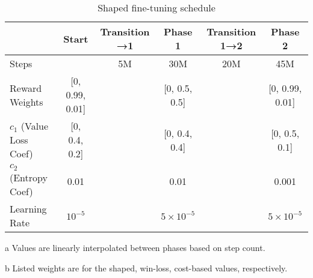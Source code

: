 \documentclass[conference]{IEEEtran}
\newcounter{supptable}
\newenvironment{supptable}
  {\renewcommand{\tablename}{Supplemental Table}\setcounter{table}{\value{supptable}}\addtocounter{supptable}{1}\begin{table}}
  {\end{table}\setcounter{supptable}{\value{table}}}
\begin{document}
\begin{supptable}[H]
\end{supptable}

\begin{supptable}[H]
    \centering
    \begin{threeparttable}
    \caption{Shaped fine-tuning schedule}
    \label{tab:shaped-finetuning-schedule}
    \begin{tabular}{lccccc}
    \toprule
     & Start & Transition →1\tnote{a} & Phase 1 & Transition 1→2\tnote{a} & Phase 2 \\
     \midrule
    Steps & & 5M & 30M & 20M & 45M \\
    Reward Weights\tnote{b} & [0, 0.99, 0.01] & & [0, 0.5, 0.5] & & [0, 0.99, 0.01] \\
    $c_1$ (Value Loss Coef)\tnote{b} & [0, 0.4, 0.2] & & [0, 0.4, 0.4] & & [0, 0.5, 0.1]\\
    $c_2$ (Entropy Coef) & 0.01 & & 0.01 & & 0.001 \\
    Learning Rate & $10^{-5}$ & & $5 \times 10^{-5}$ & & $5 \times 10^{-5}$\\
    \bottomrule
    \end{tabular}
    \begin{tablenotes}
       \item[a] Values are linearly interpolated between phases based on step count.
       \item[b] Listed weights are for the shaped, win-loss, cost-based values, respectively.
    \end{tablenotes}
    \end{threeparttable}
\end{supptable}
\end{document}
